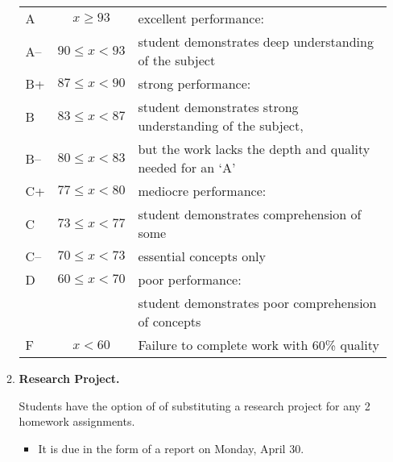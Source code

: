 \documentclass[10pt,titlepage,fleqn]{article}
\begin{document}
\begin{enumerate}
\begin{enumerate}
\begin{tabular}{|l|c|l|}
\hline
\hline
A & $x \ge 93$ & excellent performance:  \\
A-- & $90 \le x < 93$ & student demonstrates deep understanding of the subject \\ \hline
B+ & $87 \le x < 90$ & strong performance: \\ 
B  & $83 \le x < 87$ & student demonstrates strong understanding of the subject, \\ 
B-- & $80 \le x < 83$ & but the work lacks the depth and quality needed for an `A' \\ \hline
C+ & $77 \le x < 80$ & mediocre performance: \\
C  & $73 \le x < 77$ & student demonstrates comprehension of some\\
C-- & $70 \le x < 73$ & essential concepts only \\ \hline
D  & $60 \le x < 70$ & poor performance: \\ 
   &                 & student demonstrates poor comprehension of concepts \\ \hline
F  & $x < 60$ & Failure to complete work with 60\% quality \\ \hline
\end{tabular}

\bigskip
\item {\bf Research Project.}

Students have the option of of substituting a research project for any 2 homework assignments.
%
\begin{itemize}
\item It is due in the form of a report on Monday, April 30.


\end{itemize}
\end{enumerate}
\end{enumerate}
\end{document}

